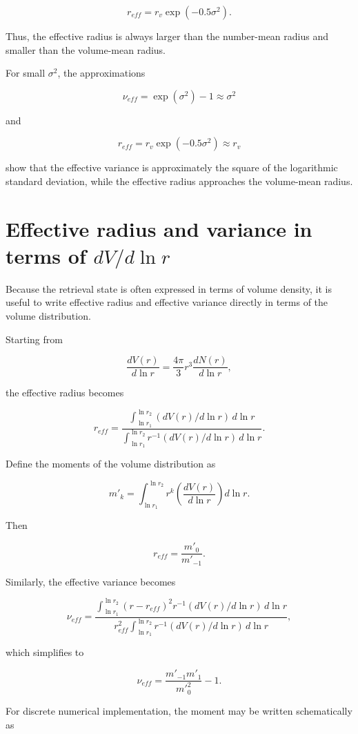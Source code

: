 \documentclass[
  letterpaper,
  open=any]{scrbook}
\begin{document}
\[
r_{eff}=r_v \exp(-0.5 \sigma^2).
\]

Thus, the effective radius is always larger than the number-mean radius
and smaller than the volume-mean radius.

For small \(\sigma^2\), the approximations

\[
\nu_{eff}=\exp (\sigma^2)-1 \approx \sigma^2
\]

and

\[
r_{eff}= r_v \exp(-0.5 \sigma^2) \approx r_v
\]

show that the effective variance is approximately the square of the
logarithmic standard deviation, while the effective radius approaches
the volume-mean radius.

\section{\texorpdfstring{Effective radius and variance in terms of
\(dV/d\ln r\)}{Effective radius and variance in terms of dV/d\textbackslash ln r}}\label{effective-radius-and-variance-in-terms-of-dvdln-r}

Because the retrieval state is often expressed in terms of volume
density, it is useful to write effective radius and effective variance
directly in terms of the volume distribution.

Starting from

\[
\frac{d V(r)}{d \ln r}=\frac{4\pi}{3} r^3 \frac{d N(r)}{d \ln r},
\]

the effective radius becomes

\[
r_{eff}=\frac{\int_{\ln r_1}^{\ln r_2} (dV(r)/d\ln r) \, d\ln r}
{\int_{\ln r_1}^{\ln r_2} r^{-1} (dV(r)/d\ln r) \, d\ln r}.
\]

Define the moments of the volume distribution as

\[
m'_k = \int_{\ln r_1}^{\ln r_2} r^k \left(\frac{dV(r)}{d\ln r}\right) d\ln r.
\]

Then

\[
r_{eff}= \frac{m'_0}{m'_{-1}}.
\]

Similarly, the effective variance becomes

\[
\nu_{eff}=\frac{\int_{\ln r_1}^{\ln r_2}(r-r_{eff})^2 r^{-1} (dV(r)/d\ln r) \, d\ln r}
{r^2_{eff} \int_{\ln r_1}^{\ln r_2} r^{-1} (dV(r)/d\ln r) \, d\ln r},
\]

which simplifies to

\[
\nu_{eff}= \frac{m'_{-1} m'_1}{m'^2_0}-1.
\]

For discrete numerical implementation, the moment may be written
schematically as
\end{document}
